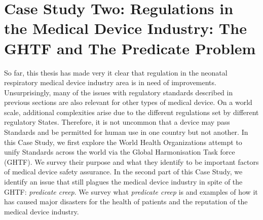 \documentclass[12pt, openany, oneside]{book}
\begin{document}
\chapter{Case Study Two: Regulations in the Medical Device Industry: The GHTF and The Predicate Problem}

So far, this thesis has made very it clear that regulation in the neonatal respiratory medical device industry area is in need of improvements. Unsurprisingly, many of the issues with regulatory standards described in previous sections are also relevant for other types of medical device. On a world scale, additional complexities arise due to the different regulations set by different regulatory States. Therefore, it is not uncommon that a device may pass Standards and be permitted for human use in one country but not another. In this Case Study, we first explore the World Health Organizations attempt to unify Standards across the world via the Global Harmonisation Task force (GHTF). We survey their purpose and what they identify to be important factors of medical device safety assurance. In the second part of this Case Study, we identify an issue that still plagues the medical device industry in spite of the GHTF: \textit{predicate creep}. We survey what \textit{predicate creep} is and examples of how it has caused major disasters for the health of patients and the reputation of the medical device industry.\\
\end{document}
